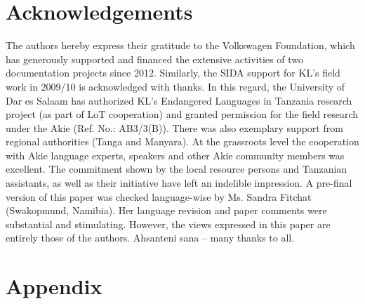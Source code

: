 \documentclass[output=paper,colorlinks,citecolor=brown]{langscibook}
\begin{document}
\section*{Acknowledgements}
The authors hereby express their gratitude to the Volkswagen Foundation, which has generously supported and financed the extensive activities of two documentation projects since 2012. Similarly, the SIDA support for KL's field work in 2009/10 is acknowledged with thanks. In this regard, the University of Dar es Salaam has authorized KL's Endangered Languages in Tanzania research project (as part of LoT cooperation) and granted permission for the field research under the Akie (Ref. No.: AB3/3(B)). There was also exemplary support from regional authorities (Tanga and Manyara). At the grassroots level the cooperation with Akie language experts, speakers and other Akie community members was excellent. The commitment shown by the local resource persons and Tanzanian assistants, as well as their initiative have left an indelible impression. A pre-final version of this paper was checked language-wise by Ms. Sandra Fitchat (Swakopmund, Namibia). Her language revision and paper comments were substantial and stimulating. However, the views expressed in this paper are entirely those of the authors. 
Ahsanteni sana -- many thanks to all.

\section*{Appendix}
\end{document}
